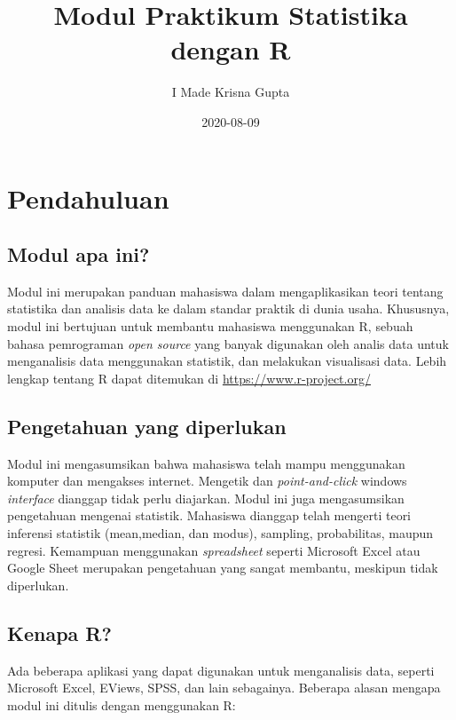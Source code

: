 \documentclass[
]{book}
\title{Modul Praktikum Statistika dengan R}
\author{I Made Krisna Gupta}
\date{2020-08-09}
\begin{document}
\maketitle

{
\setcounter{tocdepth}{1}
\tableofcontents
}
\hypertarget{pendahuluan}{%
\chapter{Pendahuluan}\label{pendahuluan}}

\hypertarget{modul-apa-ini}{%
\section{Modul apa ini?}\label{modul-apa-ini}}

Modul ini merupakan panduan mahasiswa dalam mengaplikasikan teori tentang statistika dan analisis data ke dalam standar praktik di dunia usaha. Khususnya, modul ini bertujuan untuk membantu mahasiswa menggunakan R, sebuah bahasa pemrograman \emph{open source} yang banyak digunakan oleh analis data untuk menganalisis data menggunakan statistik, dan melakukan visualisasi data. Lebih lengkap tentang R dapat ditemukan di \url{https://www.r-project.org/}

\hypertarget{pengetahuan-yang-diperlukan}{%
\section{Pengetahuan yang diperlukan}\label{pengetahuan-yang-diperlukan}}

Modul ini mengasumsikan bahwa mahasiswa telah mampu menggunakan komputer dan mengakses internet. Mengetik dan \emph{point-and-click} windows \emph{interface} dianggap tidak perlu diajarkan. Modul ini juga mengasumsikan pengetahuan mengenai statistik. Mahasiswa dianggap telah mengerti teori inferensi statistik (mean,median, dan modus), sampling, probabilitas, maupun regresi. Kemampuan menggunakan \emph{spreadsheet} seperti Microsoft Excel atau Google Sheet merupakan pengetahuan yang sangat membantu, meskipun tidak diperlukan.

\hypertarget{kenapa-r}{%
\section{Kenapa R?}\label{kenapa-r}}

Ada beberapa aplikasi yang dapat digunakan untuk menganalisis data, seperti Microsoft Excel, EViews, SPSS, dan lain sebagainya. Beberapa alasan mengapa modul ini ditulis dengan menggunakan R:
\end{document}
